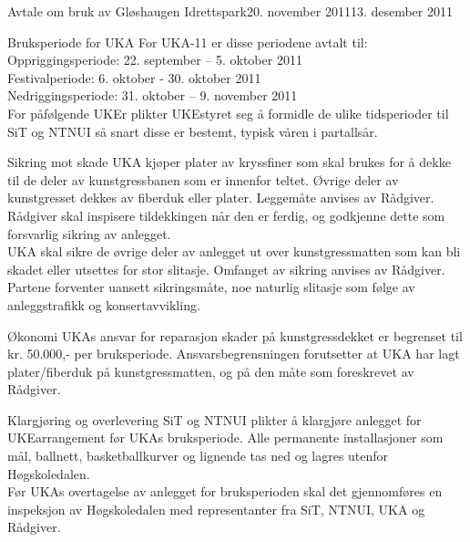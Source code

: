 \begin{instruks}{Avtale om bruk av Gløshaugen Idrettspark}{20. november 2011}{13. desember 2011}
\begin{instruksledd}{Bruksperiode for UKA}
For UKA-11 er disse periodene avtalt til:\\

Oppriggingsperiode: 	22. september – 5. oktober 2011\\
Festivalperiode: 	6. oktober - 30. oktober 2011\\
Nedriggingsperiode:	31. oktober – 9. november 2011\\

For påfølgende UKEr plikter UKEstyret seg å formidle de ulike tidsperioder til SiT og NTNUI så snart disse er bestemt, typisk våren i partallsår.
\end{instruksledd}

\begin{instruksledd}{Sikring mot skade}
UKA kjøper plater av kryssfiner som skal brukes for å dekke til de deler av kunstgressbanen som er innenfor teltet.  Øvrige deler av kunstgresset dekkes av fiberduk eller plater.  Leggemåte anvises av Rådgiver. Rådgiver skal inspisere tildekkingen når den er ferdig, og godkjenne dette som forsvarlig sikring av anlegget.\\  

UKA skal sikre de øvrige deler av anlegget ut over kunstgressmatten som kan bli skadet eller utsettes for stor slitasje. Omfanget av sikring anvises av Rådgiver. \\
 
Partene forventer uansett sikringsmåte, noe naturlig slitasje som følge av anleggstrafikk og konsertavvikling.\\
\end{instruksledd}
 
\begin{instruksledd}{Økonomi}
UKAs ansvar for reparasjon skader på kunstgressdekket er begrenset til kr. 50.000,- per bruksperiode.  Ansvarsbegrensningen forutsetter at UKA har lagt plater/fiberduk på kunstgressmatten, og på den måte som foreskrevet av Rådgiver.\\
\end{instruksledd}
  

\begin{instruksledd}{Klargjøring og overlevering}
SiT og NTNUI plikter å klargjøre anlegget for UKEarrangement før UKAs bruksperiode. Alle permanente installasjoner som mål, ballnett, basketballkurver og lignende tas ned og lagres utenfor Høgskoledalen.\\

Før UKAs overtagelse av anlegget for bruksperioden skal det gjennomføres en inspeksjon av Høgskoledalen med representanter fra SiT, NTNUI, UKA og Rådgiver. \\


\end{instruksledd}
\end{instruks}
